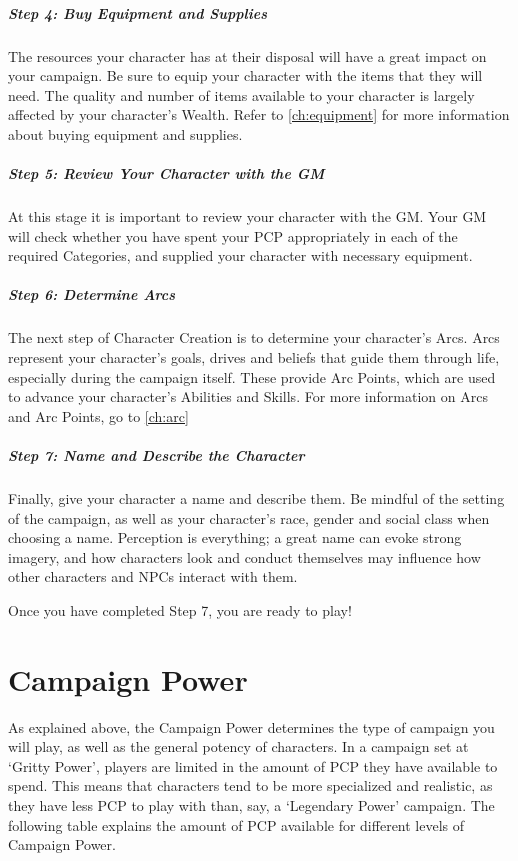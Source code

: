 \documentclass[oneside,11pt,english]{book}
\begin{document}
\subparagraph{Step 4: Buy Equipment and Supplies}
The resources your character has at their disposal will have a great impact on your campaign. Be sure to 
equip your character with the items that they will need. The quality and number of items available to your 
character is largely affected by your character’s Wealth. Refer to \autoref{ch:equipment} for more information about buying equipment and supplies.

\subparagraph{Step 5: Review Your Character with the GM}
At this stage it is important to review your character with the GM. Your GM will check whether you have 
spent your PCP appropriately in each of the required Categories, and supplied your character with 
necessary equipment. 

\subparagraph{Step 6: Determine Arcs}
The next step of Character Creation is to determine your character’s Arcs. Arcs represent your character’s 
goals, drives and beliefs that guide them through life, especially during the campaign itself. These provide 
Arc Points, which are used to advance your character’s Abilities and Skills. For more information on Arcs 
and Arc Points, go to \autoref{ch:arc}

\subparagraph{Step 7: Name and Describe the Character}
Finally, give your character a name and describe them. Be mindful of the setting of the campaign, as well 
as your character’s race, gender and social class when choosing a name. Perception is everything; a great 
name can evoke strong imagery, and how characters look and conduct themselves may influence how 
other characters and NPCs interact with them. 

Once you have completed Step 7, you are ready to play! 

\section{Campaign Power}
As explained above, the Campaign Power determines the type of campaign you will play, as well as the 
general potency of characters. In a campaign set at ‘Gritty Power’, players are limited in the amount of 
PCP they have available to spend. This means that characters tend to be more specialized and realistic, as 
they have less PCP to play with than, say, a ‘Legendary Power’ campaign. The following table explains 
the amount of PCP available for different levels of Campaign Power. 
\end{document}
